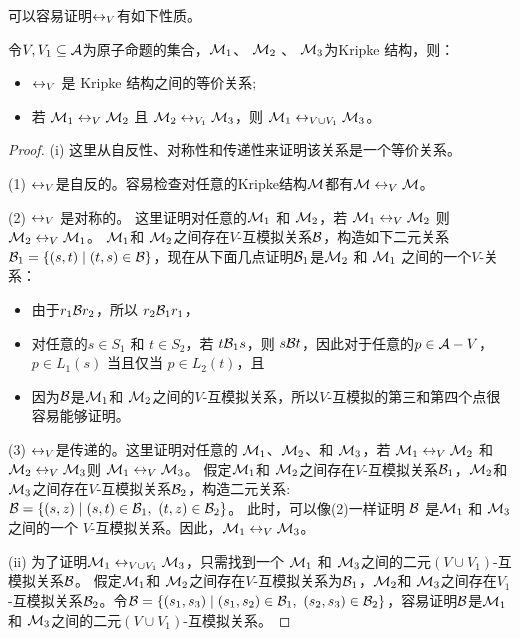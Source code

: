 可以容易证明$\leftrightarrow_V$有如下性质。

\begin{proposition} \label{pro:EqUnion}
	令$V, V_1 \subseteq {\cal A}$为原子命题的集合，${\cal M}_1$、 ${\cal M}_2$ 、 ${\cal M}_3$为Kripke 结构，则：
	\begin{itemize} 
		\item[(i)] $\leftrightarrow_V$ 是 Kripke 结构之间的等价关系;
		\item[(ii)] 若 ${\cal M}_1 \leftrightarrow_V {\cal M}_2$ 且 ${\cal M}_2 \leftrightarrow_{V_1} {\cal M}_3$，则 ${\cal M}_1 \leftrightarrow_{V \cup V_1} {\cal M}_3$。
	\end{itemize}
	
\end{proposition}
\begin{proof}
	(i) 这里从自反性、对称性和传递性来证明该关系是一个等价关系。
	
	(1) $\leftrightarrow_V$是自反的。容易检查对任意的Kripke结构${\cal M}$都有${\cal M}\leftrightarrow_V {\cal M}$。
	
	(2) $\leftrightarrow_V$ 是对称的。 这里证明对任意的${\cal M}_1$ 和 ${\cal M}_2$，若 ${\cal M}_1 \leftrightarrow_V {\cal M}_2$ 则 ${\cal M}_2 \leftrightarrow_V {\cal M}_1$。
	${\cal M}_1$和 ${\cal M}_2$之间存在$V$-互模拟关系${\cal B}$，构造如下二元关系${\cal B}_1=\{(s,t) \mid (t, s)\in {\cal B}\}$，现在从下面几点证明${\cal B}_1$是${\cal M}_2$ 和 ${\cal M}_1$ 之间的一个$V$-关系：
	\begin{itemize}
		\item 由于$r_1 {\cal B} r_2$，所以 $r_2 {\cal B}_1 r_1$，
		\item 对任意的$s\in S_1$ 和 $t\in S_2$，若 $t {\cal B}_1 s$，则 $s{\cal B} t$，因此对于任意的$p \in {\cal A} - V$，$p \in L_1(s)$ 当且仅当 $p \in L_2(t)$，且
		\item 因为${\cal B}$是${\cal M}_1$和 ${\cal M}_2$之间的$V$-互模拟关系，所以$V$-互模拟的第三和第四个点很容易能够证明。
	\end{itemize}
	
	(3) $\leftrightarrow_V$是传递的。这里证明对任意的 ${\cal M}_1$、${\cal M}_2$、和 ${\cal M}_3$，若 ${\cal M}_1 \leftrightarrow_V {\cal M}_2$ 和 ${\cal M}_2 \leftrightarrow_V {\cal M}_3$则 ${\cal M}_1 \leftrightarrow_V {\cal M}_3$。 假定${\cal M}_1$和 ${\cal M}_2$之间存在$V$-互模拟关系${\cal B}_1$，${\cal M}_2$和 ${\cal M}_3$之间存在$V$-互模拟关系${\cal B}_2$，构造二元关系: ${\cal B}=\{(s, z) \mid (s,t) \in {\cal B}_1,\ (t, z)\in {\cal B}_2\}$。
	此时，可以像(2)一样证明 ${\cal B}$ 是${\cal M}_1$ 和 ${\cal M}_3$之间的一个 $V$-互模拟关系。因此，${\cal M}_1 \leftrightarrow_V {\cal M}_3$。
	
	(ii) 为了证明${\cal M}_1 \leftrightarrow_{V\cup V_1} {\cal M}_3$，只需找到一个  ${\cal M}_1$ 和 ${\cal M}_3$之间的二元$(V\cup V_1)$-互模拟关系${\cal B}$。
	假定${\cal M}_1$和 ${\cal M}_2$之间存在$V$-互模拟关系为${\cal B}_1$，${\cal M}_2$和 ${\cal M}_3$之间存在$V_1$-互模拟关系${\cal B}_2$。令${\cal B} = \{(s_1, s_3)\mid (s_1, s_2) \in {\cal B}_1, \ (s_2, s_3) \in {\cal B}_2\}$，容易证明${\cal B}$是${\cal M}_1$ 和 ${\cal M}_3$之间的二元$(V\cup V_1)$-互模拟关系。
\end{proof}


